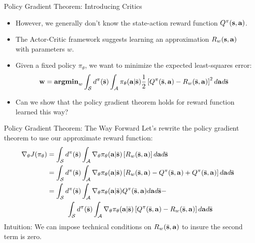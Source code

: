 \documentclass[]{beamer}
\begin{document}
\begin{frame}{Policy Gradient Theorem: Introducing Critics}
    \begin{itemize}
        \item However, we generally don't know the state-action reward function $Q^\pi(\vs, \va)$.
        \item The Actor-Critic framework suggests learning an approximation $R_w(\vs, \va)$ with parameters $w$.
        \item Given a fixed policy $\pi_\theta$, we want to minimize the expected least-squares error:
        \[ \vw = \textbf{argmin}_w \int_\cS d^\pi(\bar \vs) \int_\cA \pi_\theta(\va | \bar \vs)\frac{1}{2}\left[Q^\pi(\bar \vs, \va) - R_w(\bar \vs, \va) \right]^2 d\va d\bar \vs \]
        \item Can we show that the policy gradient theorem holds for reward function learned this way?
    \end{itemize}

\end{frame}

\begin{frame}{Policy Gradient Theorem: The Way Forward}
    Let's rewrite the policy gradient theorem to use our approximate reward function:
    \begin{align*}
        \nabla_\theta J(\pi_\theta) &= \int_\cS d^\pi(\bar \vs) \int_\cA \nabla_\theta \pi_\theta(\va | \bar \vs) \left[R_w(\bar \vs, \va) \right] d\va d\bar \vs\\
        &= \int_\cS d^\pi(\bar \vs) \int_\cA \nabla_\theta \pi_\theta(\va | \bar \vs) \left[R_w(\bar \vs, \va) - Q^\pi(\bar \vs, \va) + Q^\pi(\bar \vs, \va) \right] d\va d\bar \vs\\
        &= \int_\cS d^\pi(\bar \vs) \int_\cA \nabla_\theta \pi_\theta(\va | \bar \vs) Q^\pi(\bar \vs, \va) d\va d\bar \vs - \\
        & \hspace{1cm} \int_\cS d^\pi(\bar \vs) \int_\cA \nabla_\theta \pi_\theta(\va | \bar \vs) \left[Q^\pi(\bar \vs, \va) - R_w(\bar \vs, \va) \right] d\va d\bar \vs
    \end{align*}
    Intuition: We can impose technical conditions on $R_w(\bar \vs, \va)$ to insure the second term is zero.
\end{frame}
\end{document}
